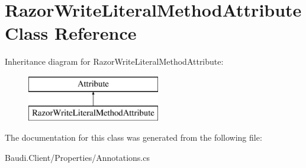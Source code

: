 \hypertarget{class_razor_write_literal_method_attribute}{}\section{Razor\+Write\+Literal\+Method\+Attribute Class Reference}
\label{class_razor_write_literal_method_attribute}
Inheritance diagram for Razor\+Write\+Literal\+Method\+Attribute\+:\begin{figure}[H]
\begin{center}
\leavevmode
\includegraphics[height=2.000000cm]{class_razor_write_literal_method_attribute}
\end{center}
\end{figure}


The documentation for this class was generated from the following file\+:\begin{DoxyCompactItemize}
\item 
Baudi.\+Client/\+Properties/Annotations.\+cs\end{DoxyCompactItemize}
